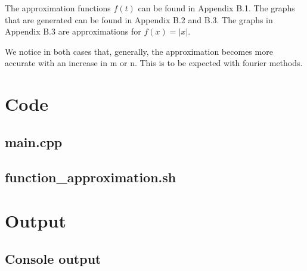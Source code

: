 \documentclass[11pt, a4paper, titlepage, openright]{article}
\begin{document}
    The approximation functions \( f(t) \) can be found in Appendix B.1. 
    The graphs that are generated can be found in Appendix B.2 and B.3. The graphs in Appendix B.3 are approximations for \( f(x) = |x| \).
    
    We notice in both cases that, generally, the approximation becomes more accurate with an increase in m or n. This is to be expected with fourier methods.

\onecolumn
\appendix
\appendixpage
\addappheadtotoc

\section{Code}
	\subsection{main.cpp}
		
	\bigskip
	\subsection{function\_approximation.sh}
		

\newpage
\section{Output}
\label{sec:output}
	\subsection{Console output}
	\label{sec:consoleOut}
		
\end{document}

